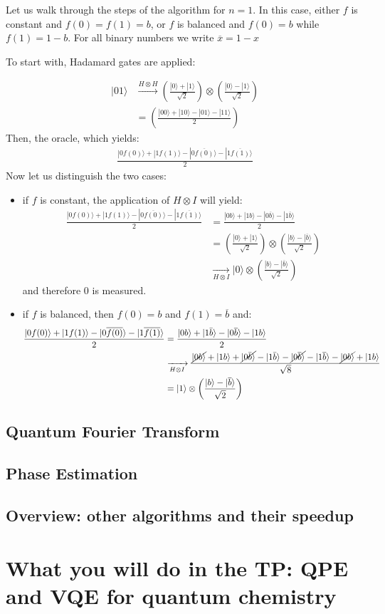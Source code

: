 \documentclass{article}
\begin{document}
Let us walk through the steps of the algorithm for $n=1$.
In this case, either $f$ is constant and $f(0)=f(1)=b$, 
or $f$ is balanced and $f(0)=b$ while $f(1)=1-b$.
For all binary numbers we write $\overline{x}=1-x$

To start with, Hadamard gates are applied:

\begin{align*}
    |01\rangle &\xrightarrow{H\otimes H} \left(\frac{|0\rangle+|1\rangle}{\sqrt{2}}\right)\otimes \left(\frac{|0\rangle-|1\rangle}{\sqrt{2}}\right)\\
    &= \left(\frac{|00\rangle+|10\rangle-|01\rangle-|11\rangle}{2}\right)
\end{align*}
Then, the oracle, which yields:
\begin{align*}
\frac{|0f(0)\rangle+|1f(1)\rangle-|0\overline{f(0)}\rangle-|1\overline{f(1)}\rangle}{2}
\end{align*}
Now let us distinguish the two cases:
\begin{itemize}
    \item if $f$ is constant, the application of $H\otimes I$ will yield:
\begin{align*}
\frac{|0f(0)\rangle+|1f(1)\rangle-|0\overline{f(0)}\rangle-|1\overline{f(1)}\rangle}{2}
&=\frac{|0b\rangle+|1b\rangle-|0\overline{b}\rangle-|1\overline{b}\rangle}{2}\\
&=\left(\frac{|0\rangle+|1\rangle}{\sqrt{2}}\right)\otimes \left(\frac{|b\rangle-|\overline{b}\rangle}{\sqrt{2}}\right)\\
&\xrightarrow[H\otimes I]{} |0\rangle \otimes \left(\frac{|b\rangle-|\overline{b}\rangle}{\sqrt{2}}\right)
\end{align*}
and therefore $0$ is measured.
\item if $f$ is balanced, then $f(0)=b$ and $f(1)=\overline{b}$ and:
\begin{align*}
\frac{|0f(0)\rangle+|1f(1)\rangle-|0\overline{f(0)}\rangle-|1\overline{f(1)}\rangle}{2}
&=\frac{|0b\rangle+|1\bar{b}\rangle-|0\overline{b}\rangle-|1b\rangle}{2}\\
&\xrightarrow[H\otimes I]{}
    \frac{\cancel{|0b\rangle}+|1b\rangle+\cancel{|0\bar{b}\rangle}-|1\bar{b}\rangle-\cancel{|0\overline{b}\rangle}-|1\overline{b}\rangle-\cancel{|0b\rangle}+|1b\rangle}{\sqrt{8}}\\
&= |1\rangle\otimes\left(\frac{|b\rangle-|\overline{b}\rangle}{\sqrt{2}}\right)
\end{align*}
\end{itemize}
\subsection{Quantum Fourier Transform}

\subsection{Phase Estimation}

\subsection{Overview: other algorithms and their speedup}



\section{What you will do in the TP: QPE and VQE for quantum chemistry}
\end{document}
